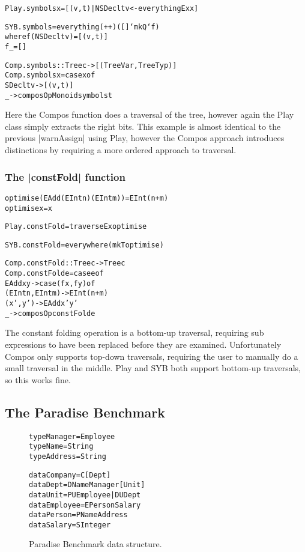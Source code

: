 \documentclass[preprint]{sigplanconf}
\newenvironment{code}{\begin{alltt}\small}{\end{alltt}}
\begin{document}
\begin{code}
Play.symbols x = [(v,t) | NSDecl t v <- everythingEx x]

SYB.symbols = everything (++) ([] `mkQ` f)
    where  f (NSDecl t v)  = [(v,t)]
           f _             = []

Comp.symbols :: Tree c -> [(Tree Var, Tree Typ)]
Comp.symbols x = case x of
    SDecl t v -> [(v,t)]
    _ -> composOpMonoid symbols t
\end{code}

Here the Compos function does a traversal of the tree, however again the Play class simply extracts the right bits. This example is almost identical to the previous |warnAssign| using Play, however the Compos approach introduces distinctions by requiring a more ordered approach to traversal.


\subsubsection{The |constFold| function}

\begin{code}
optimise (EAdd (EInt n) (EInt m)) = EInt (n+m)
optimise x = x

Play.constFold = traverseEx optimise

SYB.constFold = everywhere (mkT optimise)

Comp.constFold :: Tree c -> Tree c
Comp.constFold e = case e of
    EAdd x y -> case  (f x, f y) of
                      (EInt n, EInt m) -> EInt (n+m)
                      (x',y') -> EAdd x' y'
    _ -> composOp constFold e
\end{code}

The constant folding operation is a bottom-up traversal, requiring sub expressions to have been replaced before they are examined. Unfortunately Compos only supports top-down traversals, requiring the user to manually do a small traversal in the middle. Play and SYB both support bottom-up traversals, so this works fine.


\subsection{The Paradise Benchmark}

\begin{figure}
\begin{code}
type Manager   = Employee
type Name      = String
type Address   = String

data Company   = C [Dept]
data Dept      = D Name Manager [Unit]
data Unit      = PU Employee | DU Dept
data Employee  = E Person Salary
data Person    = P Name Address
data Salary    = S Integer
\end{code}
\caption{Paradise Benchmark data structure.}
\label{fig:paradise}
\end{figure}
\end{document}

